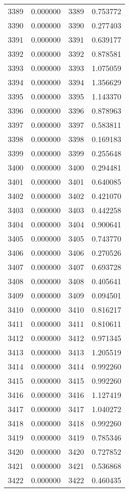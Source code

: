 \documentclass[12pt]{article}
\begin{document}
\begin{longtable}{@{}cccc@{}}
3389 & 0.000000 & 3389 & 0.753772 \\
3390 & 0.000000 & 3390 & 0.277403 \\
3391 & 0.000000 & 3391 & 0.639177 \\
3392 & 0.000000 & 3392 & 0.878581 \\
3393 & 0.000000 & 3393 & 1.075059 \\
3394 & 0.000000 & 3394 & 1.356629 \\
3395 & 0.000000 & 3395 & 1.143370 \\
3396 & 0.000000 & 3396 & 0.878963 \\
3397 & 0.000000 & 3397 & 0.583811 \\
3398 & 0.000000 & 3398 & 0.169183 \\
3399 & 0.000000 & 3399 & 0.255648 \\
3400 & 0.000000 & 3400 & 0.294481 \\
3401 & 0.000000 & 3401 & 0.640085 \\
3402 & 0.000000 & 3402 & 0.421070 \\
3403 & 0.000000 & 3403 & 0.442258 \\
3404 & 0.000000 & 3404 & 0.900641 \\
3405 & 0.000000 & 3405 & 0.743770 \\
3406 & 0.000000 & 3406 & 0.270526 \\
3407 & 0.000000 & 3407 & 0.693728 \\
3408 & 0.000000 & 3408 & 0.405641 \\
3409 & 0.000000 & 3409 & 0.094501 \\
3410 & 0.000000 & 3410 & 0.816217 \\
3411 & 0.000000 & 3411 & 0.810611 \\
3412 & 0.000000 & 3412 & 0.971345 \\
3413 & 0.000000 & 3413 & 1.205519 \\
3414 & 0.000000 & 3414 & 0.992260 \\
3415 & 0.000000 & 3415 & 0.992260 \\
3416 & 0.000000 & 3416 & 1.127419 \\
3417 & 0.000000 & 3417 & 1.040272 \\
3418 & 0.000000 & 3418 & 0.992260 \\
3419 & 0.000000 & 3419 & 0.785346 \\
3420 & 0.000000 & 3420 & 0.727852 \\
3421 & 0.000000 & 3421 & 0.536868 \\
3422 & 0.000000 & 3422 & 0.460435 \\

\end{longtable}
\end{document}
